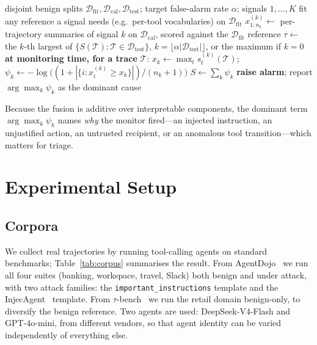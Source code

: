 \documentclass[preprint,12pt,authoryear]{elsarticle}
\theoremstyle{definition}
\newcommand{\Tcal}{\mathcal{T}}
\newcommand{\Dcal}{\mathcal{D}}
\begin{document}
\begin{algorithm}[t]
\caption{SENTRY-Fuse}\label{alg:fuse}
\begin{algorithmic}[1]
\Require disjoint benign splits $\Dcal_{\mathrm{fit}}, \Dcal_{\mathrm{cal}}, \Dcal_{\mathrm{test}}$; target false-alarm rate $\alpha$; signals $1,\dots,K$
\State fit any reference a signal needs (e.g.\ per-tool vocabularies) on $\Dcal_{\mathrm{fit}}$
  \State $x^{(k)}_{1:n_k} \gets$ per-trajectory summaries of signal $k$ on $\Dcal_{\mathrm{cal}}$, scored against the $\Dcal_{\mathrm{fit}}$ reference
\EndFor
\State $\tau \gets$ the $k$-th largest of $\{S(\Tcal) : \Tcal \in \Dcal_{\mathrm{test}}\}$, $k = \lfloor \alpha |\Dcal_{\mathrm{test}}| \rfloor$, or the maximum if $k=0$ 
\Statex \textbf{at monitoring time, for a trace} $\Tcal$:
  \State $x_k \gets \max_t s^{(k)}_t(\Tcal)$;\quad
         $\psi_k \gets -\log\big((1 + |\{i : x^{(k)}_i \ge x_k\}|)/(n_k+1)\big)$
\EndFor
\State $S \gets \sum_k \psi_k$
 \textbf{raise alarm}; report $\arg\max_k \psi_k$ as the dominant cause
\EndIf
\end{algorithmic}
\end{algorithm}

Because the fusion is additive over interpretable components, the dominant term
$\arg\max_k \psi_k$ names \emph{why} the monitor fired---an injected instruction,
an unjustified action, an untrusted recipient, or an anomalous tool
transition---which matters for triage.

\section{Experimental Setup}\label{sec:experiments}

\subsection{Corpora}

We collect real trajectories by running tool-calling agents on standard
benchmarks; Table~\ref{tab:corpus} summarises the result. From
AgentDojo~\citep{debenedetti2024agentdojo} we run all four suites (banking,
workspace, travel, Slack) both benign and under attack, with two attack
families: the \texttt{important\_\hspace{0pt}instructions} template and the
InjecAgent~\citep{zhan2024injecagent} template. From
$\tau$-bench~\citep{yao2024taubench} we run the retail domain benign-only, to
diversify the benign reference. Two agents are used: DeepSeek-V4-Flash and
GPT-4o-mini, from different vendors, so that agent identity can be varied
independently of everything else.
\end{document}
